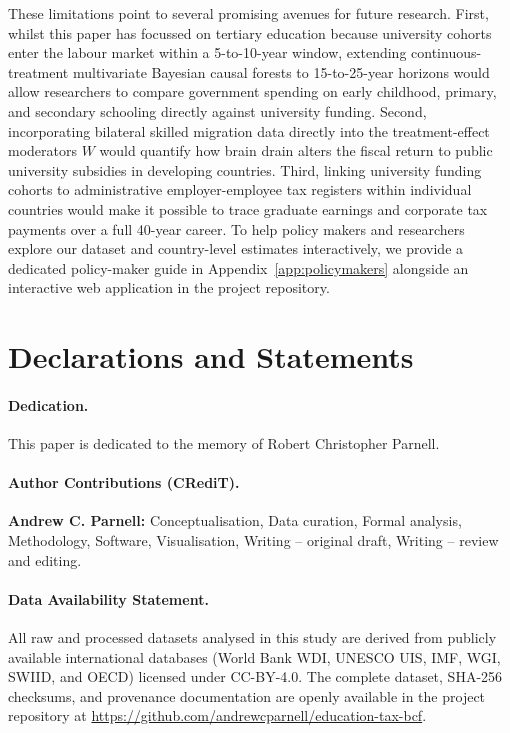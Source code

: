 \documentclass[11pt,a4paper]{article}
\begin{document}
These limitations point to several promising avenues for future research. First, whilst this paper has focussed on tertiary education because university cohorts enter the labour market within a 5-to-10-year window, extending continuous-treatment multivariate Bayesian causal forests to 15-to-25-year horizons would allow researchers to compare government spending on early childhood, primary, and secondary schooling \citep{hanushek2012better, hendren2020unified, angrist2021measuring} directly against university funding. Second, incorporating bilateral skilled migration data \citep{beine2008brain} directly into the treatment-effect moderators $W$ would quantify how brain drain alters the fiscal return to public university subsidies in developing countries. Third, linking university funding cohorts to administrative employer-employee tax registers within individual countries would make it possible to trace graduate earnings and corporate tax payments over a full 40-year career. To help policy makers and researchers explore our dataset and country-level estimates interactively, we provide a dedicated policy-maker guide in Appendix~\ref{app:policymakers} alongside an interactive web application in the project repository.

\section*{Declarations and Statements}

\paragraph{Dedication.}
This paper is dedicated to the memory of Robert Christopher Parnell.

\paragraph{Author Contributions (CRediT).}
\textbf{Andrew C. Parnell:} Conceptualisation, Data curation, Formal analysis, Methodology, Software, Visualisation, Writing -- original draft, Writing -- review and editing.

\paragraph{Data Availability Statement.}
All raw and processed datasets analysed in this study are derived from publicly available international databases (World Bank WDI, UNESCO UIS, IMF, WGI, SWIID, and OECD) licensed under CC-BY-4.0. The complete dataset, SHA-256 checksums, and provenance documentation are openly available in the project repository at \url{https://github.com/andrewcparnell/education-tax-bcf}.
\end{document}
